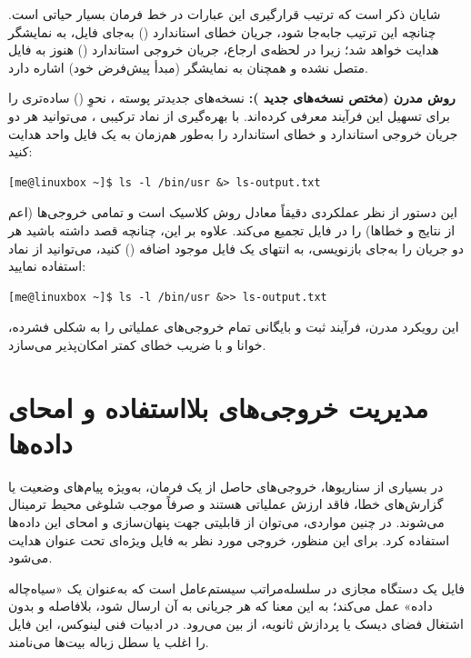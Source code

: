 شایان ذکر است که ترتیب قرارگیری این عبارات در خط فرمان بسیار حیاتی است. چنانچه این ترتیب جابه‌جا شود، جریان خطای استاندارد () به‌جای فایل، به نمایشگر هدایت خواهد شد؛ زیرا در لحظه‌ی ارجاع، جریان خروجی استاندارد () هنوز به فایل متصل نشده و همچنان به نمایشگر (مبدأ پیش‌فرض خود) اشاره دارد.

\textbf{روش مدرن (مختص نسخه‌های جدید ):} نسخه‌های جدیدتر پوسته ، نحوِ () ساده‌تری را برای تسهیل این فرآیند معرفی کرده‌اند. با بهره‌گیری از نماد ترکیبی \cmd{\&>}، می‌توانید هر دو جریان خروجی استاندارد و خطای استاندارد را به‌طور هم‌زمان به یک فایل واحد هدایت کنید:

\begin{latin}
\begin{lstlisting}
[me@linuxbox ~]$ ls -l /bin/usr &> ls-output.txt
\end{lstlisting}
\end{latin}

این دستور از نظر عملکردی دقیقاً معادل روش کلاسیک است و تمامی خروجی‌ها (اعم از نتایج و خطاها) را در فایل  تجمیع می‌کند. علاوه بر این، چنانچه قصد داشته باشید هر دو جریان را به‌جای بازنویسی، به انتهای یک فایل موجود اضافه () کنید، می‌توانید از نماد \cmd{\&>>} استفاده نمایید:

\begin{latin}
\begin{lstlisting}
[me@linuxbox ~]$ ls -l /bin/usr &>> ls-output.txt
\end{lstlisting}
\end{latin}

این رویکرد مدرن، فرآیند ثبت و بایگانی تمام خروجی‌های عملیاتی را به شکلی فشرده، خوانا و با ضریب خطای کمتر امکان‌پذیر می‌سازد.

\section{مدیریت خروجی‌های بلااستفاده و امحای داده‌ها}

در بسیاری از سناریوها، خروجی‌های حاصل از یک فرمان، به‌ویژه پیام‌های وضعیت یا گزارش‌های خطا، فاقد ارزش عملیاتی هستند و صرفاً موجب شلوغی محیط ترمینال می‌شوند. در چنین مواردی، می‌توان از قابلیتی جهت پنهان‌سازی و امحای این داده‌ها استفاده کرد. برای این منظور، خروجی مورد نظر به فایل ویژه‌ای تحت عنوان  هدایت می‌شود.

فایل  یک دستگاه مجازی در سلسله‌مراتب سیستم‌عامل است که به‌عنوان یک «سیاه‌چاله داده» عمل می‌کند؛ به این معنا که هر جریانی به آن ارسال شود، بلافاصله و بدون اشتغال فضای دیسک یا پردازش ثانویه، از بین می‌رود. در ادبیات فنی لینوکس، این فایل را اغلب  یا سطل زباله بیت‌ها می‌نامند.

